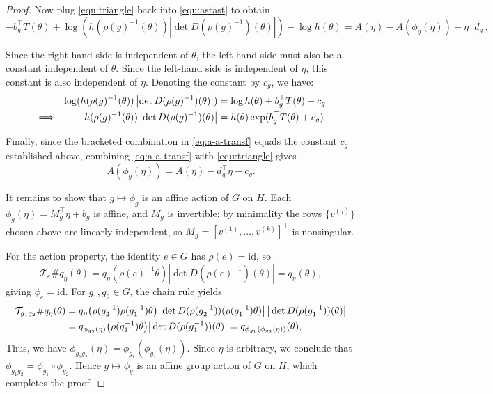 \documentclass{article}
\begin{document}
\begin{proof}
    Now plug \eqref{equ:triangle} back into  \eqref{equ:astast} to obtain
    \begin{equation}
        -b_{g}^\top T(\theta) + \log (h(\rho(g)^{-1}(\theta)) \left|\det D(\rho(g)^{-1})(\theta)\right|) - \log h(\theta) = A(\eta) - A(\phi_{g}(\eta)) - \eta^\top d_{g}\,.\label{eq:a-a-transf}
    \end{equation}

    Since the right-hand side is independent of $\theta$, the left-hand side must also be a constant independent of $\theta$. Since the left-hand side is independent of $\eta$, this constant is also independent of $\eta$. Denoting the constant by $c_{g}$, we have:
    \begin{align}
        &&\log (h(\rho(g)^{-1}(\theta)) \left|\det D(\rho(g)^{-1})(\theta)\right|) &= \log h(\theta) + b_{g}^\top T(\theta) + c_{g} \notag \\
        &\Longrightarrow& h(\rho(g)^{-1}(\theta)) \left|\det D(\rho(g)^{-1})(\theta)\right| &= h(\theta) \exp(b_{g}^\top T(\theta) + c_{g})
    \end{align}

    Finally, since the bracketed combination in \eqref{eq:a-a-transf} equals the constant $c_{g}$ established above, combining \eqref{eq:a-a-transf} with \eqref{equ:triangle} gives
    \begin{equation}
        A(\phi_{g}(\eta)) = A(\eta) - d_{g}^\top \eta - c_{g}.
    \end{equation}

    It remains to show that $g \mapsto \phi_{g}$ is an affine action of $G$ on $H$. Each $\phi_{g}(\eta) = M_{g}^\top\eta + b_{g}$ is affine, and $M_{g}$ is invertible: by minimality the rows $\{v^{(j)}\}$ chosen above are linearly independent, so $M_{g} = [v^{(1)},\dots,v^{(k)}]^\top$ is nonsingular.
    
    For the action property, the identity $e \in G$ has $\rho(e) = \mathrm{id}$, so
    \begin{equation}
        \mathcal{T}_{e} \# q_{\eta}(\theta) = q_{\eta}(\rho(e)^{-1}\theta) \left|\det D(\rho(e)^{-1})(\theta)\right| = q_{\eta}(\theta),
    \end{equation}
    giving $\phi_{e} = \mathrm{id}$. For $g_{1}, g_{2} \in G$, the chain rule yields
    \begin{align}
        \mathcal{T}_{g_{1} g_{2}} \# q_{\eta}(\theta)
        &= q_{\eta}\big(\rho(g_{2}^{-1})\rho(g_{1}^{-1})\theta\big)
           \big|\det D(\rho(g_{2}^{-1}))(\rho(g_{1}^{-1})\theta)\big|\,
           \big|\det D(\rho(g_{1}^{-1}))(\theta)\big| \notag \\
        &= q_{\phi_{g_{2}}(\eta)}\big(\rho(g_{1}^{-1})\theta\big)
           \big|\det D(\rho(g_{1}^{-1}))(\theta)\big|
        = q_{\phi_{g_{1}}(\phi_{g_{2}}(\eta))}(\theta),
    \end{align}
    Thus, we have $\phi_{g_{1} g_{2}}(\eta) = \phi_{g_{1}}(\phi_{g_{2}}(\eta))$. Since $\eta$ is arbitrary, we conclude that $\phi_{g_{1} g_{2}} = \phi_{g_{1}} \circ \phi_{g_{2}}$. Hence $g \mapsto \phi_{g}$ is an affine group action of $G$ on $H$, which completes the proof.
\end{proof}
\end{document}
